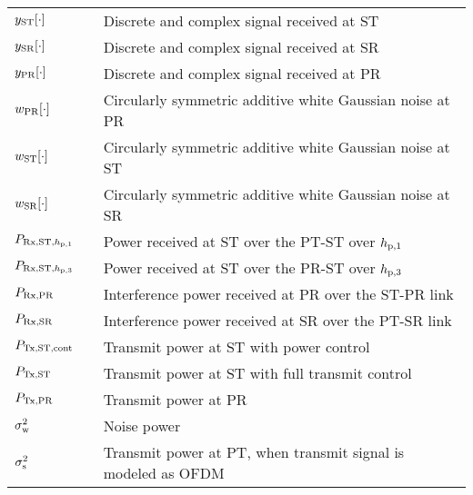 \begin{longtable}{p{}p{}p{}}
	$y_{\text{ST}}[\cdot]$       & &             Discrete and complex signal received at ST \\	
	$y_{\text{SR}}[\cdot]$          & &             Discrete and complex signal received at SR \\	
	

	$y_{\text{PR}}[\cdot]$       & &             Discrete and complex signal received at PR \\	
	$w_{\text{PR}}[\cdot]$       & &             Circularly symmetric additive white Gaussian noise at PR \\	
	$w_{\text{ST}}[\cdot]$       & &             Circularly symmetric additive white Gaussian noise at ST \\	
	$w_{\text{SR}}[\cdot]$       & &             Circularly symmetric additive white Gaussian noise at SR \\	
	$P_{\text{Rx,ST,$h_{\text{p,1}}$}}$  		& &		Power received at ST over the PT-ST over $h_{\text{p,1}}$ \\ 
	$P_{\text{Rx,ST,$h_{\text{p,3}}$}}$  		& &		Power received at ST over the PR-ST over $h_{\text{p,3}}$ \\ 
	$P_{\text{Rx,PR}}$  		& &		Interference power received at PR over the ST-PR link \\
	$P_{\text{Rx,SR}}$  		& &		Interference power received at SR over the PT-SR link\\ 

	$P_{\text{Tx,ST,cont}}$	  		& &  	Transmit power at ST with power control \\
	$P_{\text{Tx,ST}}$ 		& &  	Transmit power at ST with full transmit control \\
	$P_{\text{Tx,PR}}$  		& &		Transmit power at PR \\

	$\sigma^2_{\text{w}}$	 		& & 	Noise power \\
	$\sigma^2_{\text{s}}$	 		& &  Transmit power at PT, when transmit signal is modeled as OFDM  \\


\end{longtable}
